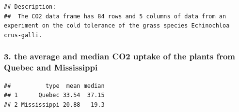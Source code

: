 \documentclass[
]{article}
\newenvironment{Shaded}{\begin{snugshade}}{\end{snugshade}}
\newcommand{\CommentTok}[1]{\textcolor[rgb]{0.56,0.35,0.01}{\textit{#1}}}
\newcommand{\ControlFlowTok}[1]{\textcolor[rgb]{0.13,0.29,0.53}{\textbf{#1}}}
\newcommand{\DecValTok}[1]{\textcolor[rgb]{0.00,0.00,0.81}{#1}}
\newcommand{\FunctionTok}[1]{\textcolor[rgb]{0.13,0.29,0.53}{\textbf{#1}}}
\newcommand{\NormalTok}[1]{#1}
\newcommand{\OtherTok}[1]{\textcolor[rgb]{0.56,0.35,0.01}{#1}}
\newcommand{\SpecialCharTok}[1]{\textcolor[rgb]{0.81,0.36,0.00}{\textbf{#1}}}
\newcommand{\StringTok}[1]{\textcolor[rgb]{0.31,0.60,0.02}{#1}}
\begin{document}
\begin{verbatim}
## Description:
##  The CO2 data frame has 84 rows and 5 columns of data from an experiment on the cold tolerance of the grass species Echinochloa crus-galli.
\end{verbatim}

\subsubsection{3. the average and median CO2 uptake of the plants from
Quebec and
Mississippi}\label{the-average-and-median-co2-uptake-of-the-plants-from-quebec-and-mississippi}

\begin{Shaded}
\end{Shaded}

\begin{verbatim}
##          type  mean median
## 1      Quebec 33.54  37.15
## 2 Mississippi 20.88   19.3
\end{verbatim}
\end{document}
